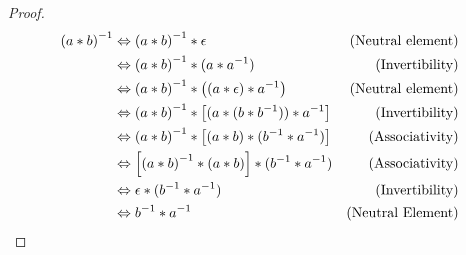 \begin{proof}
    \begin{align}
        {(a \ast b)}^{-1} &\Leftrightarrow {(a \ast b)}^{-1} \ast \epsilon &\text{(Neutral element)} \\
        &\Leftrightarrow {(a \ast b)}^{-1} \ast (a \ast {a}^{-1}) &\text{(Invertibility)} \\
        &\Leftrightarrow {(a \ast b)}^{-1} \ast \left((a \ast \epsilon) \ast {a}^{-1}\right) &\text{(Neutral element)} \\
        &\Leftrightarrow {(a \ast b)}^{-1} \ast \left[(a \ast (b \ast {b}^{-1})) \ast {a}^{-1}\right] &\text{(Invertibility)} \\
        &\Leftrightarrow {(a \ast b)}^{-1} \ast \left[(a \ast b) \ast ({b}^{-1} \ast {a}^{-1})\right] &\text{(Associativity)} \\
        &\Leftrightarrow \left[ {(a \ast b)}^{-1} \ast (a \ast b) \right] \ast ({b}^{-1} \ast {a}^{-1}) &\text{(Associativity)} \\
        &\Leftrightarrow \epsilon \ast ({b}^{-1} \ast {a}^{-1}) &\text{(Invertibility)} \\
        &\Leftrightarrow {b}^{-1} \ast {a}^{-1} &\text{(Neutral Element)}
    \end{align}
\end{proof}

